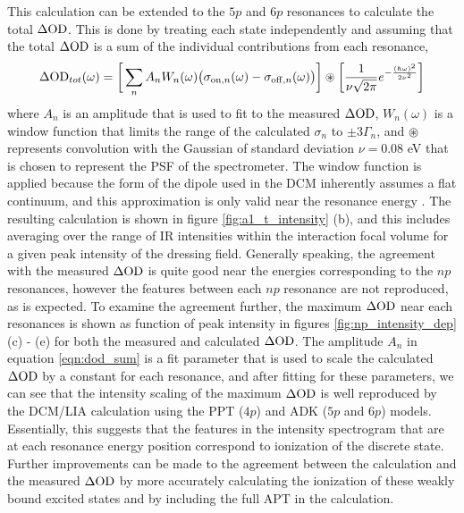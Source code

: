 This calculation can be extended to the $5p$ and $6p$ resonances to calculate the total $\Delta\mathrm{OD}$.  This is done by treating each state independently and assuming that the total $\Delta\mathrm{OD}$ is a sum of the individual contributions from each resonance,
\begin{equation}
	\label{eqn:dod_sum}
	\Delta\mathrm{OD}_{tot}(\omega) = \bigg[\sum_{n} A_n W_n(\omega)\big(\sigma_{\mathrm{on},n}(\omega) -\sigma_{\mathrm{off},n}(\omega)\big)\bigg] \circledast \bigg[\frac{1}{\nu \sqrt{2\pi}}e^{-\frac{(\hbar\omega)^2}{2\nu^2}}\bigg]
\end{equation} 
where $A_n$ is an amplitude that is used to fit to the measured $\Delta\mathrm{OD}$, $W_n(\omega)$ is a window function that limits the range of the calculated $\sigma_n$ to $\pm3\Gamma_n$, and $\circledast$ represents convolution with the Gaussian of standard deviation $\nu=0.08$ eV that is chosen to represent the PSF of the spectrometer.  The window function is applied because the form of the dipole used in the DCM inherently assumes a flat continuum, and this approximation is only valid near the resonance energy \cite{chuTheoryUltrafastAutoionization2010}.  The resulting calculation is shown in figure \ref{fig:a1_t_intensity} (b), and this includes averaging over the range of IR intensities within the interaction focal volume for a given peak intensity of the dressing field.  Generally speaking, the agreement with the measured $\Delta\mathrm{OD}$ is quite good near the energies corresponding to the $np$ resonances, however the features between each $np$ resonance are not reproduced, as is expected.  To examine the agreement further, the maximum $\Delta\mathrm{OD}$ near each resonances is shown as function of peak intensity in figures \ref{fig:np_intensity_dep} (c) - (e) for both the measured and calculated $\Delta\mathrm{OD}$.  The amplitude $A_n$ in equation \ref{eqn:dod_sum} is a fit parameter that is used to scale the calculated $\Delta\mathrm{OD}$ by a constant for each resonance, and after fitting for these parameters, we can see that the intensity scaling of the maximum $\Delta\mathrm{OD}$ is well reproduced by the DCM/LIA calculation using the PPT ($4p$) and ADK ($5p$ and $6p$) models.  Essentially, this suggests that the features in the intensity spectrogram that are at each resonance energy position correspond to ionization of the discrete state.  Further improvements can be made to the agreement between the calculation and the measured $\Delta\mathrm{OD}$ by more accurately calculating the ionization of these weakly bound excited states and by including the full APT in the calculation.

